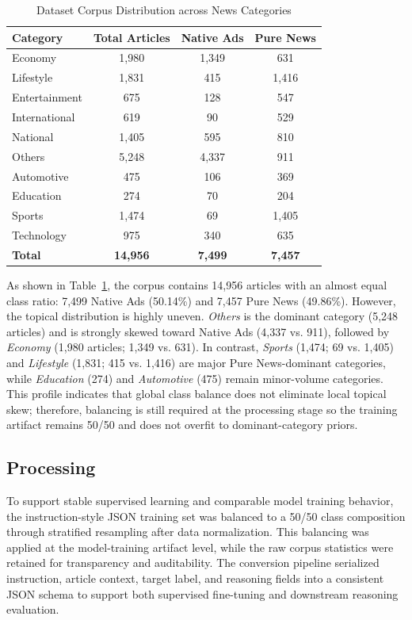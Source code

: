 \documentclass{ieeeaccess}
\begin{document}
\begin{table}[htbp]
\caption{Dataset Corpus Distribution across News Categories}
\label{tab:dataset_category_stats}
\begin{center}
\begin{tabular}{|l|c|c|c|}
\hline
\textbf{Category} & \textbf{Total Articles} & \textbf{Native Ads} & \textbf{Pure News} \\
\hline
Economy        & 1,980 & 1,349 & 631 \\
Lifestyle      & 1,831 & 415   & 1,416 \\
Entertainment  & 675   & 128   & 547 \\
International  & 619   & 90    & 529 \\
National       & 1,405 & 595   & 810 \\
Others         & 5,248 & 4,337 & 911 \\
Automotive     & 475   & 106   & 369 \\
Education      & 274   & 70    & 204 \\
Sports         & 1,474 & 69    & 1,405 \\
Technology     & 975   & 340   & 635 \\
\hline
\textbf{Total} & \textbf{14,956} & \textbf{7,499} & \textbf{7,457} \\
\hline
\end{tabular}
\end{center}
\end{table}

As shown in Table~\ref{tab:dataset_category_stats}, the corpus contains 14,956 articles with an almost equal class ratio: 7,499 Native Ads (50.14\%) and 7,457 Pure News (49.86\%). However, the topical distribution is highly uneven. \textit{Others} is the dominant category (5,248 articles) and is strongly skewed toward Native Ads (4,337 vs. 911), followed by \textit{Economy} (1,980 articles; 1,349 vs. 631). In contrast, \textit{Sports} (1,474; 69 vs. 1,405) and \textit{Lifestyle} (1,831; 415 vs. 1,416) are major Pure News-dominant categories, while \textit{Education} (274) and \textit{Automotive} (475) remain minor-volume categories. This profile indicates that global class balance does not eliminate local topical skew; therefore, balancing is still required at the processing stage so the training artifact remains 50/50 and does not overfit to dominant-category priors.

\subsection{Processing}
To support stable supervised learning and comparable model training behavior, the instruction-style JSON training set was balanced to a 50/50 class composition through stratified resampling after data normalization. This balancing was applied at the model-training artifact level, while the raw corpus statistics were retained for transparency and auditability. The conversion pipeline serialized instruction, article context, target label, and reasoning fields into a consistent JSON schema to support both supervised fine-tuning and downstream reasoning evaluation.
\end{document}
